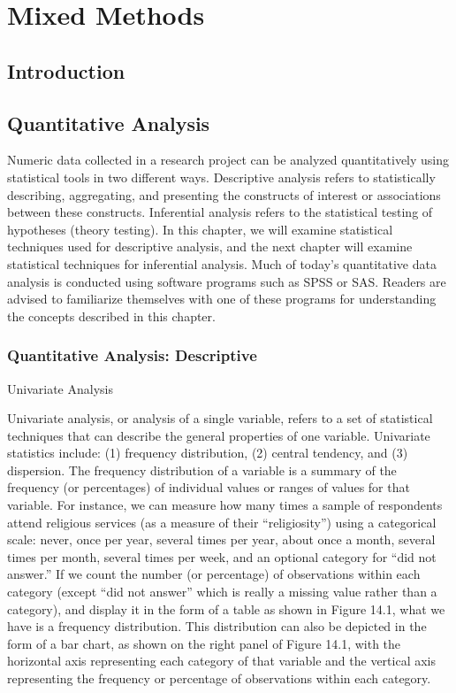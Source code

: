 \chapter{Mixed Methods}\label{ch14:mixed}

\section{Introduction}

\section{Quantitative Analysis}
Numeric data collected in a research project can be analyzed quantitatively using statistical tools in two different ways. Descriptive analysis refers to statistically describing, aggregating, and presenting the constructs of interest or associations between these constructs. Inferential analysis refers to the statistical testing of hypotheses (theory testing). In this chapter, we will examine statistical techniques used for descriptive analysis, and the next chapter will examine statistical techniques for inferential analysis. Much of today’s quantitative data analysis is conducted using software programs such as SPSS or SAS. Readers are advised to familiarize themselves with one of these programs for understanding the concepts described in this chapter.


\subsection{Quantitative Analysis: Descriptive}
Univariate Analysis

Univariate analysis, or analysis of a single variable, refers to a set of statistical techniques that can describe the general properties of one variable. Univariate statistics include: (1) frequency distribution, (2) central tendency, and (3) dispersion. The frequency distribution of a variable is a summary of the frequency (or percentages) of individual values or ranges of values for that variable. For instance, we can measure how many times a sample of respondents attend religious services (as a measure of their “religiosity”) using a categorical scale: never, once per year, several times per year, about once a month, several times per month, several times per week, and an optional category for “did not answer.” If we count the number (or percentage) of observations within each category (except “did not answer” which is really a missing value rather than a category), and display it in the form of a table as shown in Figure 14.1, what we have is a frequency distribution. This distribution can also be depicted in the form of a bar chart, as shown on the right panel of Figure 14.1, with the horizontal axis representing each category of that variable and the vertical axis representing the frequency or percentage of observations within each category.

